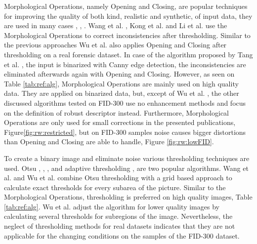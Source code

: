 \documentclass[draft,final]{vutinfth} %
\begin{document}
\par
Morphological Operations, namely Opening and Closing, are popular techniques for improving the quality of both kind, realistic and synthetic, of input data, they are  used in many cases \cite{wang2014automatic}, \cite{kong2014novel}, \cite{li2014retrieval}.
Wang et al. \cite{wang2014automatic}, Kong et al.  \cite{kong2014novel} and Li et al. \cite{li2014retrieval} use the Morphological Operations to correct inconsistencies after thresholding.
Similar to the previous approaches Wu et al. \cite{wu2019crime} also applies Opening and Closing after thresholding on a real forensic dataset.
In case of the algorithm proposed by Tang et al. \cite{tang2010footwear}, the input is binarized with Canny edge detection, the inconsistencies are eliminated afterwards again with Opening and Closing.
However, as seen on Table \ref{tab:ref:alg}, Morphological Operations are mainly used on high quality data.
They are applied on binarized data, but, except of Wu et al. \cite{wu2019crime}, the other discussed algorithms tested on FID-300 use no enhancement methods and focus on the definition of robust descriptor instead.
Furthermore, Morphological Operations are only used for small corrections in the presented publications, Figure\ref{fig:rw:restricted}, but on FID-300 samples noise causes bigger distortions than Opening and Closing are able to handle, Figure \ref{fig:rw:lowFID}.
\par
To create a binary image and eliminate noise various thresholding techniques are used.
Otsu  \cite{wu2019crime}, \cite{algarni2008novel}, \cite{alizadeh2017automatic}, \cite{kong2014novel} and adaptive thresholding \cite{wang2014automatic}, \cite{li2014retrieval} are two popular algorithms.
Wang et al. \cite{wang2014automatic} and Wu et al. \cite{wu2019crime} combine Otsu thresholding with a grid based approach to calculate exact thresholds for every subarea of the picture.
Similar to the Morphological Operations, thresholding is preferred on high quality images, Table \ref{tab:ref:alg}.
Wu et al. \cite{wu2019crime} adjust the algorithm for lower quality images by calculating several thresholds for subregions of the image.
Nevertheless, the neglect of thresholding methods for real datasets indicates that they are not applicable for the changing conditions on the samples of the FID-300 dataset.
\end{document}

